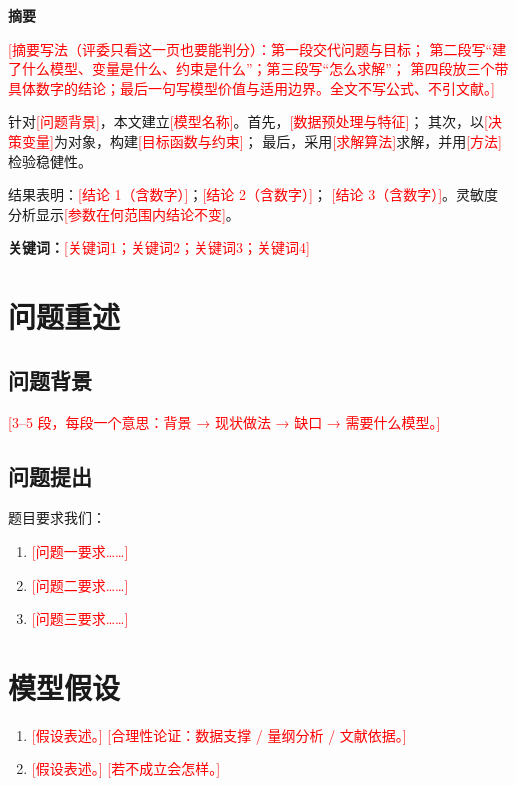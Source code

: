 \documentclass[UTF8, zihao=-4, fontset=windows, a4paper]{ctexart}
\title{\todo{论文标题：名词化短标题，20 字以内}}
\author{\todo{队号 / 学校}}
\date{}
\newcommand{\todo}[1]{\textcolor{red}{[#1]}}   %
\begin{document}
\maketitle

\begin{center}
  \textbf{\large 摘\quad 要}
\end{center}

\todo{摘要写法（评委只看这一页也要能判分）：第一段交代问题与目标；
第二段写“建了什么模型、变量是什么、约束是什么”；第三段写“怎么求解”；
第四段放三个带具体数字的结论；最后一句写模型价值与适用边界。全文不写公式、不引文献。}

针对\todo{问题背景}，本文建立\todo{模型名称}。首先，\todo{数据预处理与特征}；
其次，以\todo{决策变量}为对象，构建\todo{目标函数与约束}；
最后，采用\todo{求解算法}求解，并用\todo{方法}检验稳健性。

结果表明：\todo{结论 1（含数字）}；\todo{结论 2（含数字）}；
\todo{结论 3（含数字）}。灵敏度分析显示\todo{参数在何范围内结论不变}。

\vspace{0.6em}
\noindent\textbf{关键词：}\todo{关键词1；关键词2；关键词3；关键词4}

\newpage
\section{问题重述}

\subsection{问题背景}
\todo{3--5 段，每段一个意思：背景 → 现状做法 → 缺口 → 需要什么模型。}

\subsection{问题提出}
题目要求我们：
\begin{enumerate}[label=（\arabic*）,leftmargin=2.8em]
  \item \todo{问题一要求……}
  \item \todo{问题二要求……}
  \item \todo{问题三要求……}
\end{enumerate}

\section{模型假设}
\begin{enumerate}[label=\textbf{假设\arabic*：},leftmargin=4.2em]
  \item \todo{假设表述。} \todo{合理性论证：数据支撑 / 量纲分析 / 文献依据。}
  \item \todo{假设表述。} \todo{若不成立会怎样。}
\end{enumerate}
\end{document}
